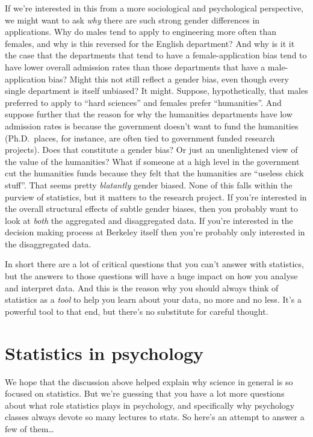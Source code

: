 \documentclass[
]{book}
\theoremstyle{definition}
\theoremstyle{definition}
\theoremstyle{definition}
\theoremstyle{definition}
\theoremstyle{remark}
\begin{document}
If we're interested in this from a more sociological and psychological perspective, we might want to ask \emph{why} there are such strong gender differences in applications. Why do males tend to apply to engineering more often than females, and why is this reversed for the English department? And why is it it the case that the departments that tend to have a female-application bias tend to have lower overall admission rates than those departments that have a male-application bias? Might this not still reflect a gender bias, even though every single department is itself unbiased? It might. Suppose, hypothetically, that males preferred to apply to ``hard sciences'' and females prefer ``humanities''. And suppose further that the reason for why the humanities departments have low admission rates is because the government doesn't want to fund the humanities (Ph.D.~places, for instance, are often tied to government funded research projects). Does that constitute a gender bias? Or just an unenlightened view of the value of the humanities? What if someone at a high level in the government cut the humanities funds because they felt that the humanities are ``useless chick stuff''. That seems pretty \emph{blatantly} gender biased. None of this falls within the purview of statistics, but it matters to the research project. If you're interested in the overall structural effects of subtle gender biases, then you probably want to look at \emph{both} the aggregated and disaggregated data. If you're interested in the decision making process at Berkeley itself then you're probably only interested in the disaggregated data.

In short there are a lot of critical questions that you can't answer with statistics, but the answers to those questions will have a huge impact on how you analyse and interpret data. And this is the reason why you should always think of statistics as a \emph{tool} to help you learn about your data, no more and no less. It's a powerful tool to that end, but there's no substitute for careful thought.

\hypertarget{statistics-in-psychology}{%
\section{Statistics in psychology}\label{statistics-in-psychology}}

We hope that the discussion above helped explain why science in general is so focused on statistics. But we're guessing that you have a lot more questions about what role statistics plays in psychology, and specifically why psychology classes always devote so many lectures to stats. So here's an attempt to answer a few of them\ldots{}
\end{document}
